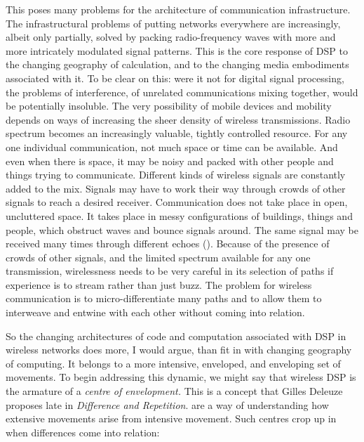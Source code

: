 This poses many problems for the architecture of communication
infrastructure. The infrastructural problems of putting networks
everywhere are increasingly, albeit only partially, solved by packing
radio{}-frequency waves with more and more intricately modulated signal
patterns. This is the core response of DSP to the changing geography of
calculation, and to the changing media embodiments associated with it.
To be clear on this: were it not for digital signal processing, the
problems of interference, of unrelated communications mixing together,
would be potentially insoluble. The very possibility of mobile devices
and mobility depends on ways of increasing the sheer density of
wireless transmissions. Radio spectrum becomes an increasingly
valuable, tightly controlled resource. For any one individual
communication, not much space or time can be available. And even when
there is space, it may be noisy and packed with other people and things
trying to communicate. Different kinds of wireless signals are
constantly added to the mix. Signals may have to work their way through
crowds of other signals to reach a desired receiver. Communication does
not take place in open, uncluttered space. It takes place in messy
configurations of buildings, things and people, which obstruct waves
and bounce signals around. The same signal may be received many times
through different echoes (). Because of the presence of
crowds of other signals, and the limited spectrum available for any one
transmission, wirelessness needs to be very careful in its selection of
paths if experience is to stream rather than just buzz. The problem for
wireless communication is to micro{}-differentiate many paths and to
allow them to interweave and entwine with each other without coming
into relation.

So the changing architectures of code and computation associated with
DSP in wireless networks does more, I would argue, than fit in with
changing geography of computing. It belongs to a more intensive,
enveloped, and enveloping set of movements. To begin addressing this
dynamic, we might say that wireless DSP is the armature of a
{\em centre of envelopment.} This is a concept that Gilles Deleuze
proposes late in {\em Difference and Repetition}.{\em }  are a way of understanding how extensive movements
arise from intensive movement. Such centres crop up in  when differences come into relation: 


